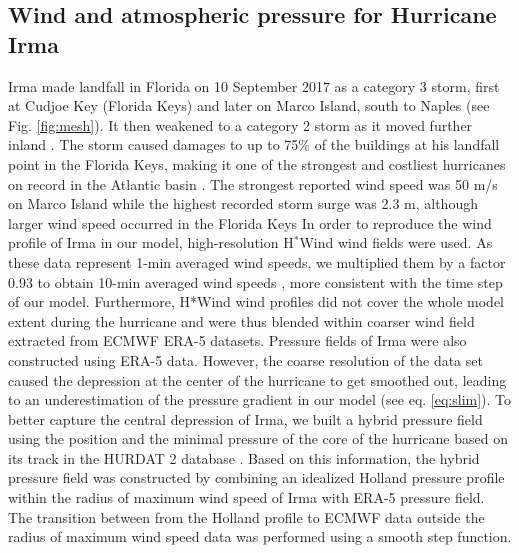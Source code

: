 \documentclass[11pt,a4paper]{article}
\begin{document}
\subsection{Wind and atmospheric pressure for Hurricane Irma}
Irma made landfall in Florida on 10 September 2017 as a category 3 storm, first at Cudjoe Key (Florida Keys) and later on Marco Island, south to Naples (see Fig. \ref{fig:mesh}). It then weakened to a category 2 storm as it moved further inland \citep{pinelli2018overview}. The storm caused damages to up to 75\% of the buildings at his landfall point in the Florida Keys, making it one of the strongest and costliest hurricanes on record in the Atlantic basin \citep{xian2018brief,zhang2019modeling}. The strongest reported wind speed was 50 m/s on Marco Island while the highest recorded storm surge was 2.3 m, although larger wind speed occurred in the Florida Keys \citep{pinelli2018overview}
In order to reproduce the wind profile of Irma in our model, high-resolution H$^\ast$Wind \citep{powell1998hrd} wind fields were used. As these data represent 1-min averaged wind speeds, we multiplied them by a factor 0.93 to obtain 10-min averaged wind speeds \citep{harper2010guidelines}, more consistent with the time step of our model. Furthermore, H*Wind wind profiles did not cover the whole model extent during the hurricane and were thus blended within coarser wind field extracted from ECMWF ERA-5 datasets. Pressure fields of Irma were also constructed using ERA-5 data. However, the coarse resolution of the data set caused the depression at the center of the hurricane to get smoothed out, leading to an underestimation of the pressure gradient in our model (see eq. \ref{eq:slim}). To better capture the central depression of Irma, we built a hybrid pressure field using the position and the minimal pressure of the core of the hurricane based on its track in the HURDAT 2 database \citep{landsea2013atlantic}. Based on this information, the hybrid pressure field was constructed by combining an idealized Holland pressure profile \citep{lin2012hurricane} within the radius of maximum wind speed of Irma \citep{knaff2018statistical} with ERA-5 pressure field. The transition between from the Holland profile to ECMWF data outside the radius of maximum wind speed data was performed using a smooth step function.
\end{document}
